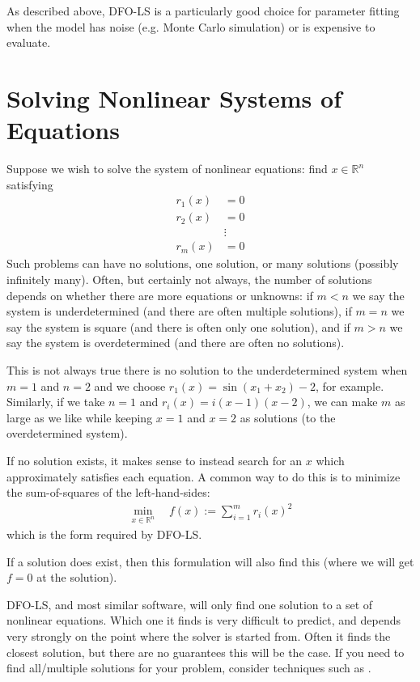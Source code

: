 \documentclass[letterpaper,10pt,english]{sphinxmanual}
\begin{document}
As described above, DFO-LS is a particularly good choice for parameter fitting when the model has noise (e.g. Monte Carlo simulation) or is expensive to evaluate.


\section{Solving Nonlinear Systems of Equations}
\label{\detokenize{info:solving-nonlinear-systems-of-equations}}
Suppose we wish to solve the system of nonlinear equations: find \(x\in\mathbb{R}^n\) satisfying
\begin{equation*}
\begin{split}r_1(x) &= 0 \\
r_2(x) &= 0 \\
&\vdots \\
r_m(x) &= 0\end{split}
\end{equation*}
Such problems can have no solutions, one solution, or many solutions (possibly infinitely many). Often, but certainly not always, the number of solutions depends on whether there are more equations or unknowns: if \(m<n\) we say the system is underdetermined (and there are often multiple solutions), if \(m=n\) we say the system is square (and there is often only one solution), and if \(m>n\) we say the system is overdetermined (and there are often no solutions).

This is not always true \textendash{} there is no solution to the underdetermined system when \(m=1\) and \(n=2\) and we choose \(r_1(x)=\sin(x_1+x_2)-2\), for example.
Similarly, if we take \(n=1\) and \(r_i(x)=i (x-1)(x-2)\), we can make \(m\) as large as we like while keeping \(x=1\) and \(x=2\) as solutions (to the overdetermined system).

If no solution exists, it makes sense to instead search for an \(x\) which approximately satisfies each equation. A common way to do this is to minimize the sum-of-squares of the left-hand-sides:
\begin{equation*}
\begin{split}\min_{x\in\mathbb{R}^n}  \quad  f(x) := \sum_{i=1}^{m}r_i(x)^2\end{split}
\end{equation*}
which is the form required by DFO-LS.

If a solution does exist, then this formulation will also find this (where we will get \(f=0\) at the solution).

 DFO-LS, and most similar software, will only find one solution to a set of nonlinear equations. Which one it finds is very difficult to predict, and depends very strongly on the point where the solver is started from. Often it finds the closest solution, but there are no guarantees this will be the case. If you need to find all/multiple solutions for your problem, consider techniques such as .
\end{document}
